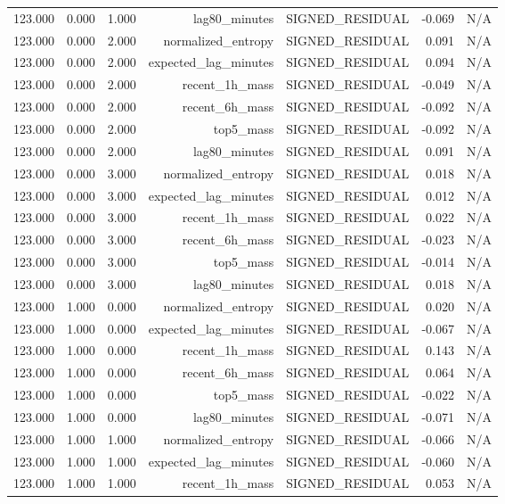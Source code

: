 \begin{table}[h!]
\begin{tabular}{lrrrrrr}
123.000 & 0.000 & 1.000 & lag80\_minutes & SIGNED\_RESIDUAL & -0.069 & N/A \\
123.000 & 0.000 & 2.000 & normalized\_entropy & SIGNED\_RESIDUAL & 0.091 & N/A \\
123.000 & 0.000 & 2.000 & expected\_lag\_minutes & SIGNED\_RESIDUAL & 0.094 & N/A \\
123.000 & 0.000 & 2.000 & recent\_1h\_mass & SIGNED\_RESIDUAL & -0.049 & N/A \\
123.000 & 0.000 & 2.000 & recent\_6h\_mass & SIGNED\_RESIDUAL & -0.092 & N/A \\
123.000 & 0.000 & 2.000 & top5\_mass & SIGNED\_RESIDUAL & -0.092 & N/A \\
123.000 & 0.000 & 2.000 & lag80\_minutes & SIGNED\_RESIDUAL & 0.091 & N/A \\
123.000 & 0.000 & 3.000 & normalized\_entropy & SIGNED\_RESIDUAL & 0.018 & N/A \\
123.000 & 0.000 & 3.000 & expected\_lag\_minutes & SIGNED\_RESIDUAL & 0.012 & N/A \\
123.000 & 0.000 & 3.000 & recent\_1h\_mass & SIGNED\_RESIDUAL & 0.022 & N/A \\
123.000 & 0.000 & 3.000 & recent\_6h\_mass & SIGNED\_RESIDUAL & -0.023 & N/A \\
123.000 & 0.000 & 3.000 & top5\_mass & SIGNED\_RESIDUAL & -0.014 & N/A \\
123.000 & 0.000 & 3.000 & lag80\_minutes & SIGNED\_RESIDUAL & 0.018 & N/A \\
123.000 & 1.000 & 0.000 & normalized\_entropy & SIGNED\_RESIDUAL & 0.020 & N/A \\
123.000 & 1.000 & 0.000 & expected\_lag\_minutes & SIGNED\_RESIDUAL & -0.067 & N/A \\
123.000 & 1.000 & 0.000 & recent\_1h\_mass & SIGNED\_RESIDUAL & 0.143 & N/A \\
123.000 & 1.000 & 0.000 & recent\_6h\_mass & SIGNED\_RESIDUAL & 0.064 & N/A \\
123.000 & 1.000 & 0.000 & top5\_mass & SIGNED\_RESIDUAL & -0.022 & N/A \\
123.000 & 1.000 & 0.000 & lag80\_minutes & SIGNED\_RESIDUAL & -0.071 & N/A \\
123.000 & 1.000 & 1.000 & normalized\_entropy & SIGNED\_RESIDUAL & -0.066 & N/A \\
123.000 & 1.000 & 1.000 & expected\_lag\_minutes & SIGNED\_RESIDUAL & -0.060 & N/A \\
123.000 & 1.000 & 1.000 & recent\_1h\_mass & SIGNED\_RESIDUAL & 0.053 & N/A \\

\end{tabular}
\end{table}
